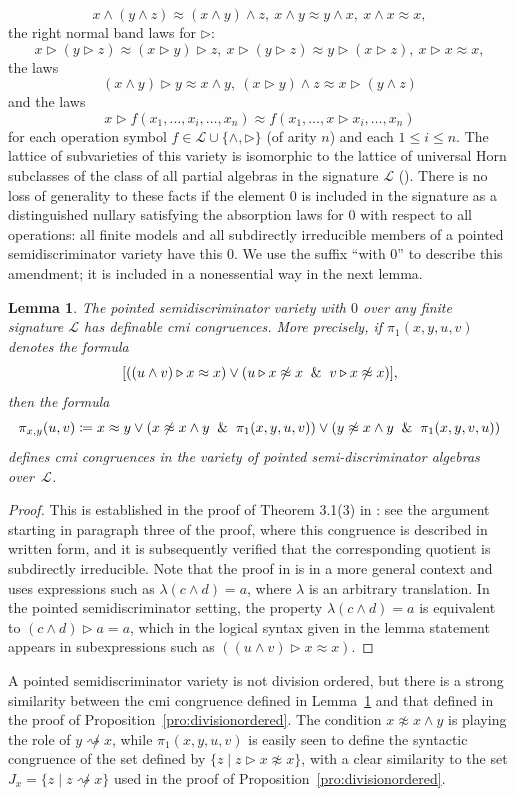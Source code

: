 \documentclass[reqno]{amsart}
\theoremstyle{plain}
\newtheorem{lem}[thm]{Lemma}
\theoremstyle{definition}
\newcommand{\divides}{\rightsquigarrow}
\newcommand{\tr}{\triangleright}
\begin{document}
\[
x\wedge (y\wedge z)\approx (x\wedge y)\wedge z,\ x\wedge y\approx y\wedge x,\ x\wedge x\approx x,
\]
 the right normal band laws for  $\tr$:
\[
x\tr (y\tr z)\approx (x\tr y)\tr z,\ x\tr (y\tr z)\approx y\tr (x\tr z),\ x\tr x\approx x,
\]
the laws
\[
(x\wedge y)\tr y\approx x\wedge y,\ (x\tr y)\wedge z\approx x\tr (y\wedge z)
\]
and the laws 
\[
x\tr f(x_1,\dots,x_i,\dots,x_n)\approx f(x_1,\dots,x\tr x_i,\dots,x_n)
\]
for each operation symbol $f\in \mathscr{L}\cup\{\wedge,\tr\}$ (of arity $n$) and each $1\leq i\leq n$.  The lattice of subvarieties of this variety is isomorphic to the lattice of  universal Horn subclasses of the class of all partial algebras in the signature $\mathscr{L}$ (\cite[Corollary~5.4]{jac:flat}).
There is no loss of generality to these facts if the element $0$ is included in the signature as a distinguished nullary satisfying the absorption laws for $0$ with respect to all operations: all finite models and all subdirectly irreducible members of a pointed semidiscriminator variety have this $0$.  We use the suffix ``with $0$'' to describe this amendment; it is included in a nonessential way in the next lemma.

 

\begin{lem}\label{lem:si}
The pointed semidiscriminator variety with $0$ over any finite signature $\mathscr{L}$ has definable cmi congruences.  More precisely, if $\pi_1(x,y,u,v)$ denotes the formula
\[
[((u\wedge v)\tr x\approx x) \vee (u\tr x\not\approx x\And v\tr x\not\approx x)],
\]
then the formula 
\[
\pi_{x,y}(u,v)\coloneqq x\approx y\vee (x\not\approx x\wedge y\And\pi_1(x,y,u,v))\vee(y\not\approx x\wedge y\And\pi_1(x,y,v,u))
\]
defines cmi congruences in the variety of pointed semi-discriminator algebras over~$\mathscr{L}$.
\end{lem}
\begin{proof}
This is established in the proof of Theorem 3.1(3) in \cite{jac:flat}: see the argument starting in paragraph three of the proof, where this congruence is described in written form, and it is subsequently verified that the corresponding quotient is subdirectly irreducible.  Note that the proof in \cite{jac:flat} is in a more general context and uses expressions such as $\lambda(c\wedge d)=a$, where $\lambda$ is an arbitrary translation.  In the pointed semidiscriminator setting, the property $\lambda(c\wedge d)=a$ is equivalent to $(c\wedge d)\tr a=a$, which in the logical syntax given in the lemma statement appears in subexpressions such as $((u\wedge v)\tr x\approx x)$.
\end{proof}
A pointed semidiscriminator variety is not division ordered, but there is a strong similarity between the cmi congruence defined in Lemma~\ref{lem:si} and that defined in the proof of Proposition~\ref{pro:divisionordered}.  The condition $x\not\approx x\wedge y$ is playing the role of $y\not\divides x$, while $\pi_1(x,y,u,v)$ is easily seen to define the syntactic congruence of the set defined by $\{z\mid z\tr x\not\approx x\}$, with a clear similarity to the set $J_x=\{z\mid z\not\divides x\}$ used in the proof of Proposition~\ref{pro:divisionordered}.
\end{document}
